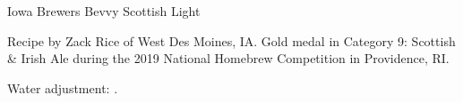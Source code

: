 \stylesection{\stylescottishlight}

\begin{recipe}{Iowa Brewers Bevvy Scottish Light} %

\begin{aboutblock}
Recipe by Zack Rice of West Des Moines, IA. Gold medal in Category 9: Scottish \& Irish
Ale during the 2019 National Homebrew Competition in Providence, RI. \sourceaha
\end{aboutblock}


\begin{methodandtiming}
 
\begin{mashsteps}
\end{mashsteps}

\begin{fermentationsteps}
\end{fermentationsteps}

\begin{directions}
Water adjustment: .
\end{directions}

\end{methodandtiming}

\recipebreak

\begin{ingredientsblock}

\begin{malts}
\end{malts}

\begin{hops}
\end{hops}


\end{ingredientsblock}

\end{recipe}

